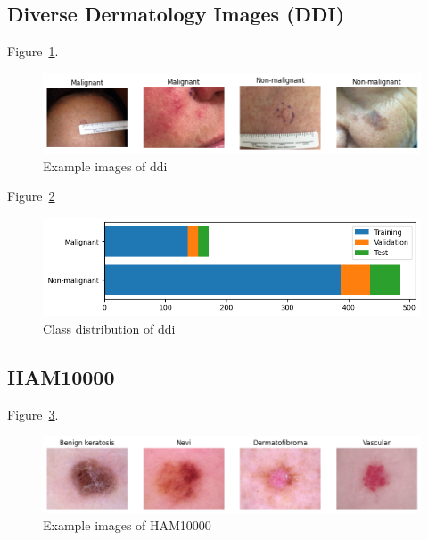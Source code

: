 \subsection{Diverse Dermatology Images (DDI)}
Figure~\ref{fig:example_images_of_ddi}.

\begin{figure}[H]
    \begin{center}
    \includegraphics[width=15cm]{../images/example_images_of_ddi.png}
    \caption{Example images of \gls{ddi}}
   \label{fig:example_images_of_ddi}
    \end{center}
\end{figure}

Figure~\ref{fig:class_distribution_of_ddi}

\begin{figure}[H]
    \begin{center}
    \includegraphics[width=15cm]{../images/class_distribution_of_ddi.png}
    \caption{Class distribution of \gls{ddi}}
   \label{fig:class_distribution_of_ddi}
    \end{center}
\end{figure}
\subsection{HAM10000}
Figure~\ref{fig:example_images_of_ham10000}.

\begin{figure}[H]
    \begin{center}
    \includegraphics[width=15cm]{../images/example_images_of_ham10000.png}
    \caption{Example images of HAM10000}
   \label{fig:example_images_of_ham10000}
    \end{center}
\end{figure}

